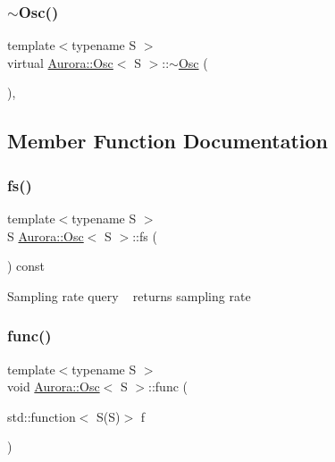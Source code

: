 \subsubsection{\texorpdfstring{$\sim$\+Osc()}{~Osc()}}
{\footnotesize\ttfamily template$<$typename S $>$ \\
virtual \hyperlink{class_aurora_1_1_osc}{Aurora\+::\+Osc}$<$ S $>$\+::$\sim$\hyperlink{class_aurora_1_1_osc}{Osc} (\begin{DoxyParamCaption}{ }\end{DoxyParamCaption})\hspace{0.3cm}{\ttfamily [inline]}, {\ttfamily [virtual]}}



\subsection{Member Function Documentation}
\mbox{\label{class_aurora_1_1_osc_a9ac3aa9006fc98588b2163e0e56f6e30}} 
\subsubsection{\texorpdfstring{fs()}{fs()}}
{\footnotesize\ttfamily template$<$typename S $>$ \\
S \hyperlink{class_aurora_1_1_osc}{Aurora\+::\+Osc}$<$ S $>$\+::fs (\begin{DoxyParamCaption}{ }\end{DoxyParamCaption}) const\hspace{0.3cm}{\ttfamily [inline]}}

Sampling rate query ~\newline
returns sampling rate \mbox{\label{class_aurora_1_1_osc_a1ffdfa0db8932dbaa7cc96e046a6d461}} 
\subsubsection{\texorpdfstring{func()}{func()}}
{\footnotesize\ttfamily template$<$typename S $>$ \\
void \hyperlink{class_aurora_1_1_osc}{Aurora\+::\+Osc}$<$ S $>$\+::func (\begin{DoxyParamCaption}\item[{std\+::function$<$ S(S)$>$}]{f }\end{DoxyParamCaption})\hspace{0.3cm}{\ttfamily [inline]}}

